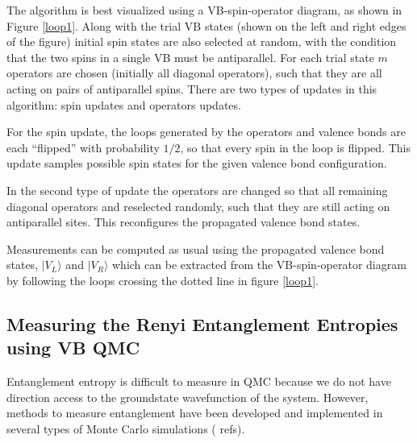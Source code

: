 \documentclass[prb,aps,twocolumn,floatfix,amsmath,amssymb,superscriptaddress,tightenlines]{revtex4}
\begin{document}
The algorithm is best visualized using a VB-spin-operator diagram, as shown in Figure \ref{loop1}.
Along with the trial VB states (shown on the left and right edges of the figure) initial spin states are also selected at random, with the condition that the two spins in a single VB must be antiparallel.
For each trial state $m$ operators are chosen (initially all diagonal operators), such that they are all acting on pairs of antiparallel spins.
There are two types of updates in this algorithm: spin updates and operators updates.

For the spin update, the loops generated by the operators and valence bonds are each ``flipped'' with probability $1/2$, so that every spin in the loop is flipped.
This update samples possible spin states for the given valence bond configuration.

In the second type of update the operators are changed so that all remaining diagonal operators and reselected randomly, such that they are still acting on antiparallel sites.
This reconfigures the propagated valence bond states.

Measurements can be computed as usual using the propagated valence bond states, $\lvert V_L \rangle$ and $\lvert V_R \rangle$ which can be extracted from the VB-spin-operator diagram by following the loops crossing the dotted line in figure \ref{loop1}.



\subsection{Measuring the Renyi Entanglement Entropies using VB QMC}
Entanglement entropy is difficult to measure in QMC because we do not have direction access to the groundstate wavefunction of the system.
However, methods to measure entanglement have been developed and implemented in {\color{red} several} types of Monte Carlo simulations ({\color{red} refs}).
\end{document}
